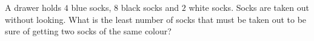 A drawer holds $4$ blue socks, $8$ black socks and $2$ white socks. Socks are taken out without looking. What is the least number of socks that must be taken out to be sure of getting two socks of the same colour?
